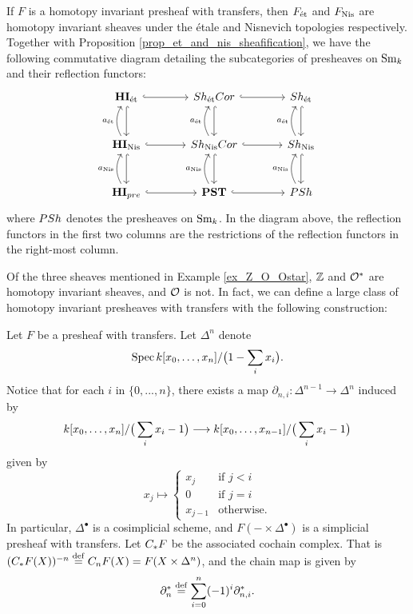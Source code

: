 \begin{rmk}
If $F$ is a homotopy invariant presheaf with transfers, then
$\Etale{F}$ and $\NisSh{F}$ are homotopy invariant sheaves under
the \'etale and Nisnevich topologies respectively. Together with
Proposition \ref{prop_et_and_nis_sheafification}, we have the following
commutative diagram detailing the subcategories of presheaves on
$\Sm$ and their reflection functors:
\[
\begin{tikzcd}[column sep=large, row sep=large]
\HIEt \arrow[hookrightarrow]{r} \arrow[hookrightarrow]{d} &
\ShEtCor \arrow[hookrightarrow]{r} \arrow[hookrightarrow]{d} &
\ShEt \arrow[hookrightarrow]{d} \\
\HINis \arrow[hookrightarrow]{r} \arrow[hookrightarrow]{d} 
\arrow[bend left]{u}{\etale}&
\ShNisCor \arrow[hookrightarrow]{r} \arrow[hookrightarrow]{d} 
\arrow[bend left]{u}{\etale}&
\ShNis \arrow[hookrightarrow]{d} 
\arrow[bend left]{u}{\etale}\\
\HIPST \arrow[hookrightarrow]{r} \arrow[bend left]{u}{\nis} &
\PST \arrow[hookrightarrow]{r} \arrow[bend left]{u}{\nis}&
\PSh \arrow[bend left]{u}{\nis}
\end{tikzcd}
\]
where $\PSh$ denotes the presheaves on $\Sm$. In the diagram above,
the reflection functors in the first two columns are the restrictions
of the reflection functors in the right-most column.
\end{rmk}

Of the three sheaves mentioned in Example \ref{ex_Z_O_Ostar}, $\Z$
and $\Ox$ are homotopy invariant sheaves, and $\O$ is not. In fact,
we can define a large class of homotopy invariant presheaves with
transfers with the following construction:

\begin{constr}\label{constr_suslin_C}
Let $F$ be a presheaf with transfers. Let $\Delta^n$ denote
\[
\Spec \basefield [x_0,\dots,x_n]/\big(1 - \sum_{i} x_i \big).
\]
Notice that for each $i$ in $\{0,...,n\}$, there exists a map 
$\partial_{n, i} : \Delta^{n - 1} \to \Delta^{n}$ induced by
\[
\basefield [x_0,\dots,x_n]/\big(\sum_{i} x_i - 1 \big)
\to \basefield [x_0,\dots,x_{n - 1}]/\big(\sum_{i} x_i - 1 \big)
\]
given by 
\[
x_j \mapsto
\begin{cases}
x_j & \textrm{if }j < i \\
0 & \textrm{if }j = i \\
x_{j - 1} &\textrm{otherwise}.
\end{cases}
\]
In particular, $\Delta^{\bullet}$ is a cosimplicial scheme, and 
$F( - \times \Delta^\bullet)$ is a simplicial presheaf with
transfers. Let $\suslC F$ be the associated cochain complex. That
is $(\suslC F(X))^{-n} \defeq \suslC[n] F(X) = F(X \times 
\Delta^n)$, and the chain map is given by
\[
\partial_{n}^* \defeq \sum_{i = 0}^{n} (-1)^i \partial_{n,i}^*.
\]
\end{constr}

